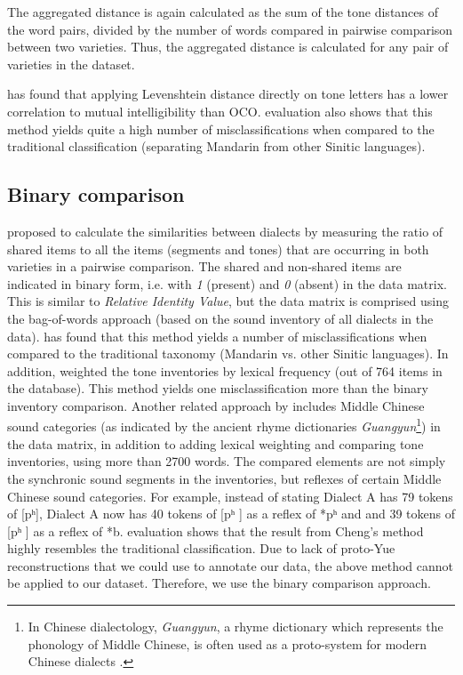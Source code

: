 \documentclass[output=paper, chinesefont]{langscibook}
\begin{document}
The aggregated distance is again calculated as the sum of the tone distances of the word pairs, divided by the number of words compared in pairwise comparison between two varieties. Thus, the aggregated distance is calculated for any pair of varieties in the dataset.

\citet{YangCastro2008} has found that applying Levenshtein distance directly on  tone letters has a lower correlation to mutual intelligibility than OCO.  evaluation also shows that this method yields quite a high number of misclassifications when compared to the traditional classification (separating Mandarin from other Sinitic languages).

\subsection{Binary comparison}
\label{sec:sung:3.4}
\citet[53]{Cheng1997} proposed to calculate the similarities between dialects by measuring the ratio of shared items to all the items (segments and tones) that are occurring in both varieties in a pairwise comparison. The shared and non-shared items are indicated in binary form, i.e. with \textit{1} (present) and \textit{0} (absent) in the data matrix. This is similar to  \textit{Relative Identity Value}, but the data matrix is comprised using the bag-of-words approach (based on the sound inventory of all dialects in the data). \citet[105–106]{Tang2009} has found that this method yields a number of misclassifications when compared to the traditional taxonomy (Mandarin vs. other Sinitic languages). In addition, \citet[114--115]{Tang2009} weighted the tone inventories by lexical frequency (out of 764 items in the database). This method yields one misclassification more than the binary inventory comparison. Another related approach by \citet[88-89]{Cheng1991} includes Middle Chinese sound categories (as indicated by the ancient rhyme dictionaries \textit{Guangyun}\footnote{In Chinese dialectology, \textit{Guangyun}, a rhyme dictionary which represents the phonology of Middle Chinese, is often used as a proto-system for modern Chinese dialects \citep[85-86]{YouChinDial}.}) in the data matrix, in addition to adding lexical weighting and comparing tone inventories, using more than 2700 words. The compared elements are not simply the synchronic sound segments in the inventories, but reflexes of certain Middle Chinese sound categories. For example, instead of stating Dialect A has 79 tokens of [pʰ], Dialect A now has 40 tokens of [pʰ ] as a reflex of *pʰ  and and 39 tokens of [pʰ ] as a reflex of *b.  evaluation shows that the result from Cheng’s method highly resembles the traditional classification. Due to lack of proto-Yue reconstructions that we could use to annotate our data, the above method cannot be applied to our dataset. Therefore, we use the binary comparison approach. 
\end{document}
